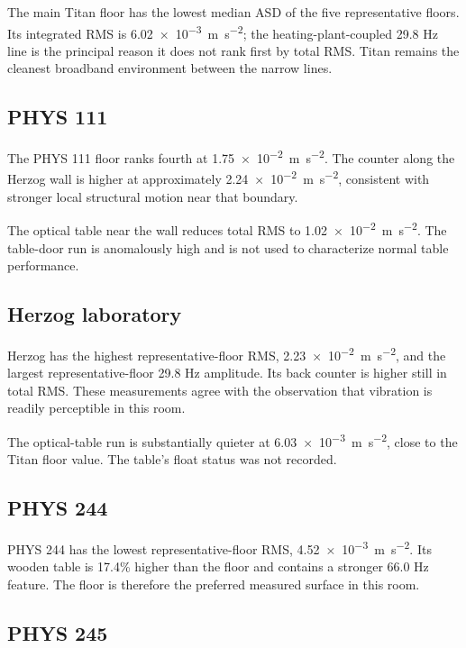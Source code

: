 \documentclass[11pt]{article}
\begin{document}
The main Titan floor has the lowest median ASD of the five representative
floors. Its integrated RMS is
\SI{6.02e-3}{\meter\per\second\squared}; the heating-plant-coupled 29.8 Hz
line is the principal reason it does not rank first by total RMS. Titan remains
the cleanest broadband environment between the narrow lines.

\subsection{PHYS 111}

The PHYS 111 floor ranks fourth at
\SI{1.75e-2}{\meter\per\second\squared}. The counter along the Herzog wall is
higher at approximately \SI{2.24e-2}{\meter\per\second\squared}, consistent
with stronger local structural motion near that boundary.

The optical table near the wall reduces total RMS to
\SI{1.02e-2}{\meter\per\second\squared}. The table-door run is anomalously
high and is not used to characterize normal table performance.

\subsection{Herzog laboratory}

Herzog has the highest representative-floor RMS,
\SI{2.23e-2}{\meter\per\second\squared}, and the largest representative-floor
29.8 Hz amplitude. Its back counter is higher still in total RMS. These
measurements agree with the observation that vibration is readily perceptible
in this room.

The optical-table run is substantially quieter at
\SI{6.03e-3}{\meter\per\second\squared}, close to the Titan floor value.
The table's float status was not recorded.

\subsection{PHYS 244}

PHYS 244 has the lowest representative-floor RMS,
\SI{4.52e-3}{\meter\per\second\squared}. Its wooden table is 17.4\% higher
than the floor and contains a stronger 66.0 Hz feature. The floor is therefore
the preferred measured surface in this room.

\subsection{PHYS 245}
\end{document}
